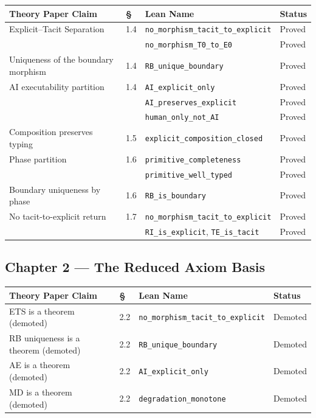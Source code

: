 \begin{center}
\begin{tabular}{p{5.2cm}lp{4.5cm}l}
\toprule
Theory Paper Claim & \S & Lean Name & Status \\
\midrule
Explicit--Tacit Separation
  & 1.4 & \texttt{no\_morphism\_tacit\_to\_explicit} & Proved \\
  &     & \texttt{no\_morphism\_T0\_to\_E0}           & Proved \\
Uniqueness of the boundary morphism
  & 1.4 & \texttt{RB\_unique\_boundary}                & Proved \\
AI executability partition
  & 1.4 & \texttt{AI\_explicit\_only}                  & Proved \\
  &     & \texttt{AI\_preserves\_explicit}              & Proved \\
  &     & \texttt{human\_only\_not\_AI}                 & Proved \\
Composition preserves typing
  & 1.5 & \texttt{explicit\_composition\_closed}        & Proved \\
Phase partition
  & 1.6 & \texttt{primitive\_completeness}              & Proved \\
  &     & \texttt{primitive\_well\_typed}               & Proved \\
Boundary uniqueness by phase
  & 1.6 & \texttt{RB\_is\_boundary}                     & Proved \\
No tacit-to-explicit return
  & 1.7 & \texttt{no\_morphism\_tacit\_to\_explicit}    & Proved \\
  &     & \texttt{RI\_is\_explicit}, \texttt{TE\_is\_tacit} & Proved \\
\bottomrule
\end{tabular}
\end{center}

\noindent{}

\subsection*{Chapter 2 — The Reduced Axiom Basis}

\begin{center}
\begin{tabular}{p{5.2cm}lp{4.5cm}l}
\toprule
Theory Paper Claim & \S & Lean Name & Status \\
\midrule
ETS is a theorem (demoted)
  & 2.2 & \texttt{no\_morphism\_tacit\_to\_explicit}    & Demoted \\
RB uniqueness is a theorem (demoted)
  & 2.2 & \texttt{RB\_unique\_boundary}                 & Demoted \\
AE is a theorem (demoted)
  & 2.2 & \texttt{AI\_explicit\_only}                   & Demoted \\
MD is a theorem (demoted)
  & 2.2 & \texttt{degradation\_monotone}                & Demoted \\
\bottomrule
\end{tabular}
\end{center}

